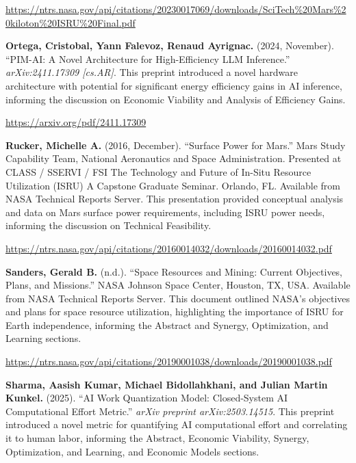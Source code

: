 \documentclass[fontsize=10pt, oneside, DIV=calc]{scrartcl}
\begin{document}
\href{https://ntrs.nasa.gov/api/citations/20230017069/downloads/SciTech\%20Mars\%20kiloton\%20ISRU\%20Final.pdf}{\url{https://ntrs.nasa.gov/api/citations/20230017069/downloads/SciTech\%20Mars\%20kiloton\%20ISRU\%20Final.pdf}}

\vspace{1em}
\noindent \textbf{Ortega, Cristobal, Yann Falevoz, Renaud Ayrignac.} (2024, November). ``PIM-AI: A Novel Architecture for High-Efficiency LLM Inference.'' \textit{arXiv:2411.17309 [cs.AR]}. This preprint introduced a novel hardware architecture with potential for significant energy efficiency gains in AI inference, informing the discussion on Economic Viability and Analysis of Efficiency Gains. 



\href{https://arxiv.org/pdf/2411.17309}{\url{https://arxiv.org/pdf/2411.17309}}

\vspace{1em}
\noindent \textbf{Rucker, Michelle A.} (2016, December). ``Surface Power for Mars.'' Mars Study Capability Team, National Aeronautics and Space Administration. Presented at CLASS / SSERVI / FSI The Technology and Future of In-Situ Resource Utilization (ISRU) A Capstone Graduate Seminar. Orlando, FL. Available from NASA Technical Reports Server. This presentation provided conceptual analysis and data on Mars surface power requirements, including ISRU power needs, informing the discussion on Technical Feasibility. 



\href{https://ntrs.nasa.gov/api/citations/20160014032/downloads/20160014032.pdf}{\url{https://ntrs.nasa.gov/api/citations/20160014032/downloads/20160014032.pdf}}

\vspace{1em}
\noindent \textbf{Sanders, Gerald B.} (n.d.). ``Space Resources and Mining: Current Objectives, Plans, and Missions.'' NASA Johnson Space Center, Houston, TX, USA. Available from NASA Technical Reports Server. This document outlined NASA's objectives and plans for space resource utilization, highlighting the importance of ISRU for Earth independence, informing the Abstract and Synergy, Optimization, and Learning sections. 



\href{https://ntrs.nasa.gov/api/citations/20190001038/downloads/20190001038.pdf}{\url{https://ntrs.nasa.gov/api/citations/20190001038/downloads/20190001038.pdf}}

\vspace{1em}
\noindent \textbf{Sharma, Aasish Kumar, Michael Bidollahkhani, and Julian Martin Kunkel.} (2025). ``AI Work Quantization Model: Closed-System AI Computational Effort Metric.'' \textit{arXiv preprint arXiv:2503.14515}. This preprint introduced a novel metric for quantifying AI computational effort and correlating it to human labor, informing the Abstract, Economic Viability, Synergy, Optimization, and Learning, and Economic Models sections. 
\end{document}
